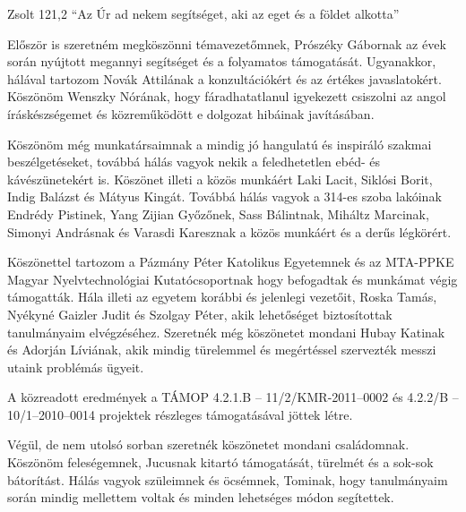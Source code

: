 \begin{chapquote}{Zsolt 121,2}
``Az Úr ad nekem segítséget, aki az eget és a földet alkotta''
\end{chapquote} 

Először is szeretném megköszönni témavezetőmnek, Prószéky Gábornak az évek során nyújtott megannyi segítséget és a folyamatos támogatását.
Ugyanakkor, hálával tartozom Novák Attilának a konzultációkért és az értékes javaslatokért.
Köszönöm Wenszky Nórának, hogy fáradhatatlanul igyekezett csiszolni az angol íráskészségemet és közreműködött e dolgozat hibáinak javításában.

Köszönöm még munkatársaimnak a mindig jó hangulatú és inspiráló szakmai beszélgetéseket, továbbá hálás vagyok nekik a feledhetetlen ebéd- és kávészünetekért is. 
Köszönet illeti a közös munkáért Laki Lacit, Siklósi Borit, Indig Balázst és Mátyus Kingát.
Továbbá hálás vagyok a 314-es szoba lakóinak Endrédy Pistinek, Yang Zijian Győzőnek, Sass Bálintnak, Miháltz Marcinak, Simonyi Andrásnak és Varasdi Karesznak a közös munkáért és a derűs légkörért.

Köszönettel tartozom a Pázmány Péter Katolikus Egyetemnek és az MTA-PPKE Magyar Nyelvtechnológiai Kutatócsoportnak hogy befogadtak és munkámat végig támogatták.
Hála illeti az egyetem korábbi és jelenlegi vezetőit, Roska Tamás, Nyékyné Gaizler Judit és Szolgay Péter, akik lehetőséget biztosítottak tanulmányaim elvégzéséhez.
Szeretnék még köszönetet mondani Hubay Katinak és Adorján Líviának, akik mindig türelemmel és megértéssel szervezték messzi utaink problémás ügyeit.

A közreadott eredmények a TÁMOP 4.2.1.B -- 11/2/KMR-2011–0002 és 4.2.2/B -- 10/1–2010–0014 projektek részleges támogatásával jöttek létre.

Végül, de nem utolsó sorban szeretnék köszönetet mondani családomnak.
Köszönöm feleségemnek, Jucusnak kitartó támogatását, türelmét és a sok-sok bátorítást.
Hálás vagyok szüleimnek és öcsémnek, Tominak, hogy tanulmányaim során mindig mellettem voltak és minden lehetséges módon segítettek.

